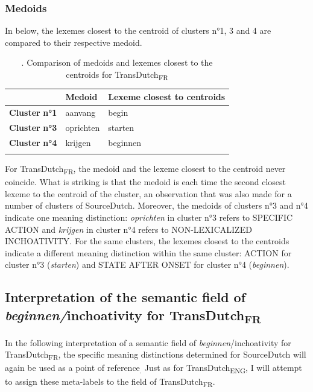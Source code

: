 \subsubsection{Medoids}
\label{sec:4.4.3.2}  
In  below, the lexemes closest to the centroid of clusters n°1, 3 and 4 are compared to their respective medoid.

\begin{table}
\caption{\label{tab:4:16}. Comparison of medoids and lexemes closest to the centroids for TransDutch\textsubscript{FR}}
\begin{tabularx}{\textwidth}{XXl}
\lsptoprule
& \textbf{Medoid} & \textbf{Lexeme} \textbf{closest} \textbf{to} \textbf{centroids}\\
\midrule 
\textbf{Cluster} \textbf{n°1} & aanvang & begin\\
\textbf{Cluster} \textbf{n°3} & oprichten & starten\\
\textbf{Cluster} \textbf{n°4} & krijgen & beginnen\\
\lspbottomrule
\end{tabularx}
\end{table}

For TransDutch\textsubscript{FR}, the medoid and the lexeme closest to the centroid never coincide. What is striking is that the medoid is each time the second closest lexeme to the centroid of the cluster, an observation that was also made for a number of clusters of SourceDutch. Moreover, the medoids of clusters n°3 and n°4 indicate one meaning distinction: \textit{oprichten} in cluster n°3 refers to {SPECIFIC} ACTION and \textit{krijgen} in cluster n°4 refers to {NON-LEXICALIZED INCHOATIVITY}. For the same clusters, the lexemes closest to the centroids indicate a different meaning distinction within the same cluster: ACTION for cluster n°3 (\textit{starten}) and STATE AFTER ONSET for cluster n°4 (\textit{beginnen}).

\subsection{Interpretation of the semantic field of \textit{beginnen/}inchoativity for TransDutch\textsubscript{FR}}
\label{sec:4.4.4}  
In the following interpretation of a semantic field of \textit{beginnen}/inchoativity for TransDutch\textsubscript{FR}, the specific meaning distinctions determined for SourceDutch will again be used as a point of reference\textsubscript{.} Just as for TransDutch\textsubscript{ENG}, I will attempt to assign these meta-labels to the field of TransDutch\textsubscript{FR}.

